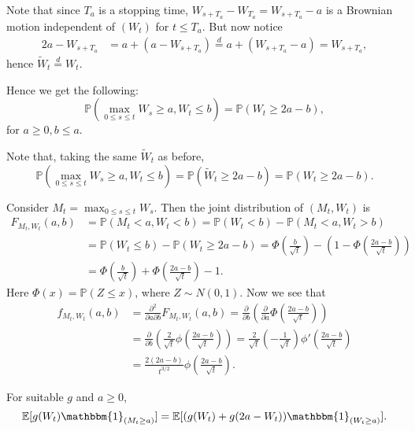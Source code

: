 \documentclass[12pt]{article}
\begin{document}
\begin{proofbox}
	Note that since $T_a$ is a stopping time, $W_{s + T_a} - W_{T_a} = W_{s + T_a} - a$ is a Brownian motion independent of $(W_t)$ for $t \leq T_a$. But now notice
	\begin{align*}
		2a - W_{s + T_a} &= a + (a - W_{s + T_a}) \overset{d}= a + (W_{s + T_a} - a) = W_{s + T_a},
	\end{align*}
	hence $\tilde W_t \overset d= W_t$.
\end{proofbox}

Hence we get the following:
\[
\mathbb{P}(\max_{0 \leq s \leq t} W_s \geq a, W_t \leq b) = \mathbb{P}(W_t \geq 2a - b),
\]
for $a \geq 0, b \leq a$.

\begin{proofbox}
	Note that, taking the same $\tilde W_t$ as before,
	\[
	\mathbb{P}(\max_{0 \leq s \leq t} W_s \geq a, W_t \leq b) = \mathbb{P}(\tilde W_t \geq 2a - b) = \mathbb{P}(W_t \geq 2a - b).
	\]
\end{proofbox}

Consider $M_t = \max_{0 \leq s \leq t}W_s$. Then the joint distribution of $(M_t, W_t)$ is
\begin{align*}
	F_{M_t, W_t}(a, b) &= \mathbb{P}(M_t < a, W_t < b) = \mathbb{P}(W_t < b) - \mathbb{P}(M_t < a, W_t > b) \\
			   &= \mathbb{P}(W_t \leq b) - \mathbb{P}(W_t \geq 2a - b) = \Phi\left(\frac{b}{\sqrt t} \right) - \left( 1 - \Phi \left( \frac{2a - b}{\sqrt t} \right) \right) \\
			   &= \Phi \left( \frac{b}{\sqrt t} \right) + \Phi \left( \frac{2a - b}{\sqrt t} \right) - 1.
\end{align*}
Here $\Phi(x) = \mathbb{P}(Z \leq x)$, where $Z \sim N(0, 1)$. Now we see that
\begin{align*}
	f_{M_t, W_t}(a, b) &= \frac{\partial^2}{\partial a \partial b}F_{M_t, W_t}(a, b) = \frac{\partial}{\partial b} \left( \frac{\partial}{\partial a} \Phi \left( \frac{2a - b}{ \sqrt t} \right) \right) \\
			   &= \frac{\partial}{\partial b} \left( \frac{2}{\sqrt t} \phi\left( \frac{2a - b}{\sqrt t} \right) \right) = \frac{2}{\sqrt t} \left( - \frac{1}{\sqrt t} \right) \phi' \left( \frac{2a - b}{\sqrt t} \right) \\
			   &= \frac{2(2a - b)}{t^{3/2}} \phi \left( \frac{2a - b}{ \sqrt t} \right).
\end{align*}

\begin{proposition}
	For suitable $g$ and $a \geq 0$,
	\[
	\mathbb{E}[g(W_t) \mathbbm{1}_{(M_t \geq a)}] = \mathbb{E}[(g(W_t) + g(2a - W_t))\mathbbm{1}_{(W_t \geq a)}].
	\]
\end{proposition}
\end{document}
